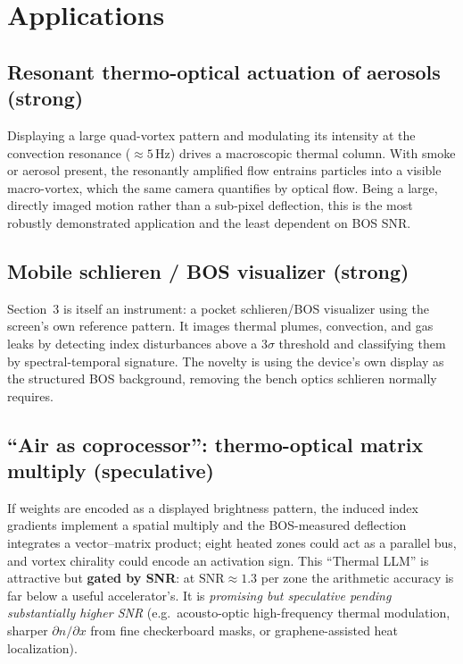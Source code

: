 \documentclass[11pt]{article}
\begin{document}
\section{Applications}
\subsection{Resonant thermo-optical actuation of aerosols (strong)}
Displaying a large quad-vortex pattern and modulating its intensity at the convection resonance
($\approx5$\,Hz) drives a macroscopic thermal column. With smoke or aerosol present, the
resonantly amplified flow entrains particles into a visible macro-vortex, which the same camera
quantifies by optical flow. Being a large, directly imaged motion rather than a sub-pixel
deflection, this is the most robustly demonstrated application and the least dependent on BOS SNR.

\subsection{Mobile schlieren / BOS visualizer (strong)}
Section~3 is itself an instrument: a pocket schlieren/BOS visualizer using the screen's own
reference pattern. It images thermal plumes, convection, and gas leaks by detecting index
disturbances above a $3\sigma$ threshold and classifying them by spectral-temporal signature.
The novelty is using the device's own display as the structured BOS background, removing the
bench optics schlieren normally requires.

\subsection{``Air as coprocessor'': thermo-optical matrix multiply (speculative)}
If weights are encoded as a displayed brightness pattern, the induced index gradients implement
a spatial multiply and the BOS-measured deflection integrates a vector--matrix product; eight
heated zones could act as a parallel bus, and vortex chirality could encode an activation sign.
This ``Thermal LLM'' is attractive but \textbf{gated by SNR}: at $\mathrm{SNR}\approx1.3$ per
zone the arithmetic accuracy is far below a useful accelerator's. It is \emph{promising but
speculative pending substantially higher SNR} (e.g.\ acousto-optic high-frequency thermal
modulation, sharper $\partial n/\partial x$ from fine checkerboard masks, or graphene-assisted
heat localization).
\end{document}
